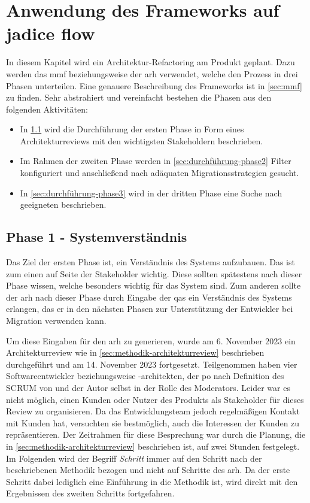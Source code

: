\chapter{Anwendung des Frameworks auf jadice flow}
\label{chap:anwendung}

In diesem Kapitel wird ein Architektur-Refactoring am Produkt \jf geplant.
Dazu werden das \acrfull{mmf} beziehungsweise der \acrfull{arh} verwendet, welche den Prozess in drei Phasen unterteilen.
Eine genauere Beschreibung des Frameworks ist in \cref{sec:mmf} zu finden.
Sehr abstrahiert und vereinfacht bestehen die Phasen aus den folgenden Aktivitäten:
\begin{itemize}
	\item In \cref{sec:durchführung-phase1} wird die Durchführung der ersten Phase in Form eines Architekturreviews mit den wichtigsten Stakeholdern beschrieben.
	\item Im Rahmen der zweiten Phase werden in \cref{sec:durchführung-phase2} Filter konfiguriert und anschließend nach adäquaten Migrationsstrategien gesucht.
	\item In \cref{sec:durchführung-phase3} wird in der dritten Phase eine Suche nach geeigneten \bpp beschrieben.
\end{itemize}

\section{Phase 1 - Systemverständnis}
\label{sec:durchführung-phase1}

Das Ziel der ersten Phase ist, ein Verständnis des Systems aufzubauen.
Das ist zum einen auf Seite der Stakeholder wichtig.
Diese sollten spätestens nach dieser Phase wissen, welche  besonders wichtig für das System sind.
Zum anderen sollte der \gls{arh} nach dieser Phase durch Eingabe der \glspl{qa} ein Verständnis des Systems erlangen, das er in den nächsten Phasen zur Unterstützung der Entwickler bei Migration verwenden kann.

Um diese Eingaben für den \gls{arh} zu generieren, wurde am 6. November 2023 ein Architekturreview wie in \cref{sec:methodik-architekturreview} beschrieben durchgeführt und am 14. November 2023 fortgesetzt.
Teil\-genommen haben vier Softwareentwickler beziehungsweise -architekten, der \acrlong{po} nach Definition des SCRUM von  und der Autor selbst in der Rolle des Moderators.
Leider war es nicht möglich, einen Kunden oder Nutzer des Produkts als Stakeholder für dieses Review zu organisieren.
Da das Entwicklungsteam jedoch regelmäßigen Kontakt mit Kunden hat, versuchten sie bestmöglich, auch die Interessen der Kunden zu repräsentieren.
Der Zeitrahmen für diese Besprechung war durch die Planung, die in \cref{sec:methodik-architekturreview} beschrieben ist, auf zwei Stunden festgelegt.
Im Folgenden wird der Begriff \emph{Schritt} immer auf den Schritt nach der beschriebenen Methodik bezogen und nicht auf Schritte des \gls{arh}.
Da der erste Schritt dabei lediglich eine Einführung in die Methodik ist, wird direkt mit den Ergebnissen des zweiten Schritts fortgefahren.

